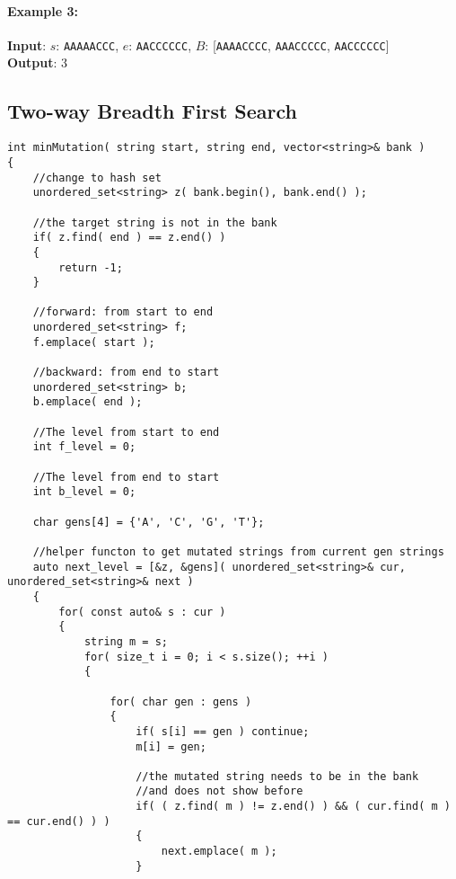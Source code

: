 \paragraph{Example 3:}
\begin{flushleft}
\textbf{Input}: $s$: \texttt{AAAAACCC}, $e$: \texttt{AACCCCCC}, $B$: [\texttt{AAAACCCC}, \texttt{AAACCCCC}, \texttt{AACCCCCC}]
\\
\textbf{Output}: 3
\end{flushleft} 

\subsection{Two-way Breadth First Search}

\setcounter{lstlisting}{0}
\begin{lstlisting}[style=customc, caption={Two-way Breadth First Search}]
int minMutation( string start, string end, vector<string>& bank )
{
    //change to hash set
    unordered_set<string> z( bank.begin(), bank.end() );

    //the target string is not in the bank
    if( z.find( end ) == z.end() )
    {
        return -1;
    }

    //forward: from start to end
    unordered_set<string> f;
    f.emplace( start );

    //backward: from end to start
    unordered_set<string> b;
    b.emplace( end );

    //The level from start to end
    int f_level = 0;

    //The level from end to start
    int b_level = 0;

    char gens[4] = {'A', 'C', 'G', 'T'};

    //helper functon to get mutated strings from current gen strings
    auto next_level = [&z, &gens]( unordered_set<string>& cur, unordered_set<string>& next )
    {
        for( const auto& s : cur )
        {
            string m = s;
            for( size_t i = 0; i < s.size(); ++i )
            {

                for( char gen : gens )
                {
                    if( s[i] == gen ) continue;
                    m[i] = gen;

                    //the mutated string needs to be in the bank
                    //and does not show before
                    if( ( z.find( m ) != z.end() ) && ( cur.find( m ) == cur.end() ) )
                    {
                        next.emplace( m );
                    }


\end{lstlisting}
